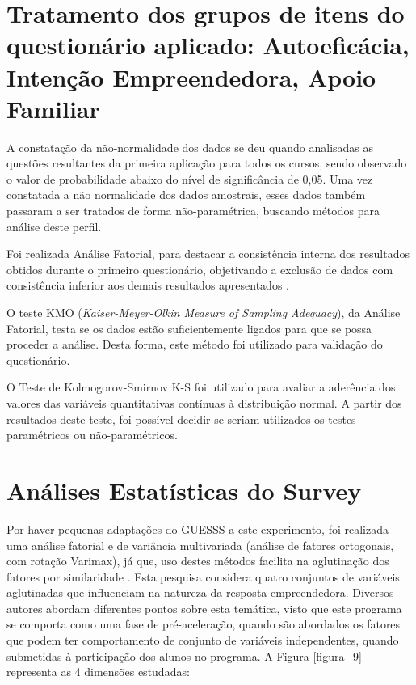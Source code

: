 \section{Tratamento dos grupos de itens do questionário aplicado: Autoeficácia, Intenção Empreendedora, Apoio Familiar}

A constatação da não-normalidade dos dados se deu quando analisadas as questões resultantes da primeira aplicação para todos os cursos, sendo observado o valor de probabilidade abaixo do nível de significância de 0,05. Uma vez constatada a não normalidade dos dados amostrais, esses dados também passaram a ser tratados de forma não-paramétrica, buscando métodos para análise deste perfil.

Foi realizada Análise Fatorial, para destacar a consistência interna dos resultados obtidos durante o primeiro questionário, objetivando a exclusão de dados com consistência inferior aos demais resultados apresentados .

O teste KMO (\textit{Kaiser-Meyer-Olkin Measure of Sampling Adequacy}), da Análise Fatorial, testa se os dados estão suficientemente ligados para que se possa proceder a análise. Desta forma, este método foi utilizado para validação do questionário.

O Teste de Kolmogorov-Smirnov K-S foi utilizado para avaliar a aderência dos valores das variáveis quantitativas contínuas à distribuição normal. A partir dos resultados deste teste, foi possível decidir se seriam utilizados os testes paramétricos ou não-paramétricos.

\section{Análises Estatísticas do Survey}


Por haver pequenas adaptações do GUESSS a este experimento, foi realizada uma análise fatorial e de variância multivariada (análise de fatores ortogonais, com rotação Varimax), já que, uso destes métodos facilita na aglutinação dos fatores por similaridade \cite{hair_multivariate_2006}. Esta pesquisa considera quatro conjuntos de variáveis aglutinadas que influenciam na natureza da resposta empreendedora. Diversos autores abordam diferentes pontos sobre esta temática, visto que este programa se comporta como uma fase de pré-aceleração, quando são abordados os fatores que podem ter comportamento de conjunto de variáveis independentes, quando submetidas à participação dos alunos no programa. A Figura \ref{figura_9} representa as 4 dimensões estudadas:


